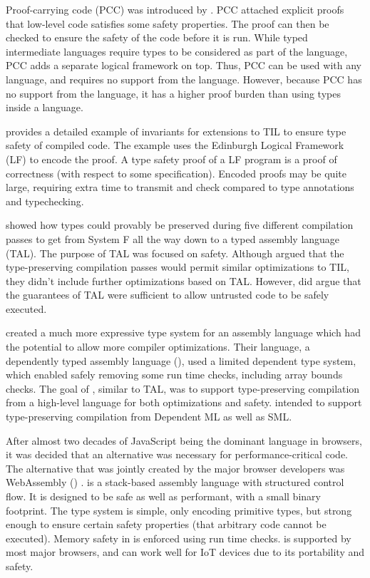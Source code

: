 Proof-carrying code (PCC) was introduced by \citet{PCC}.
PCC attached explicit proofs that low-level code satisfies some safety properties.
The proof can then be checked to ensure the safety of the code before it is run.
While typed intermediate languages require types to be considered as part of the language, PCC adds a separate logical framework on top.
Thus, PCC can be used with any language, and requires no support from the language.
However, because PCC has no support from the language, it has a higher proof burden than using types inside a language.

\citet{PCC} provides a detailed example of invariants for extensions to TIL to ensure type safety of compiled code.
The example uses the Edinburgh Logical Framework (LF) to encode the proof.
A type safety proof of a LF program is a proof of correctness (with respect to some specification).
Encoded proofs may be quite large, requiring extra time to transmit and check compared to type annotations and typechecking.

\citet{FtoTAL} showed how types could provably be preserved during five different compilation passes to get from System F all the way down to a typed assembly language (TAL).
The purpose of TAL was focused on safety.
Although \citet{FtoTAL} argued that the type-preserving compilation passes would permit similar optimizations to TIL, they didn't include further optimizations based on TAL.
However, \citet{FtoTAL} did argue that the guarantees of TAL were sufficient to allow untrusted code to be safely executed.

\citet{DTAL} created a much more expressive type system for an assembly language which had the potential to allow more compiler optimizations.
Their language, a dependently typed assembly language (\dtal), used a limited dependent type system, which enabled safely removing some run time checks, including array bounds checks.
The goal of \dtal, similar to TAL, was to support type-preserving compilation from a high-level language for both optimizations and safety.
\dtal intended to support type-preserving compilation from Dependent ML as well as SML.

After almost two decades of JavaScript being the dominant language in browsers, it was decided that an alternative was necessary for performance-critical code.
The alternative that was jointly created by the major browser developers was WebAssembly (\wasm) \cite{WASM}.
\wasm is a stack-based assembly language with structured control flow.
It is designed to be safe as well as performant, with a small binary footprint.
The \wasm type system is simple, only encoding primitive types, but strong enough to ensure certain safety properties (\ie that arbitrary code cannot be executed).
Memory safety in \wasm is enforced using run time checks.
\wasm is supported by most major browsers, and can work well for IoT devices due to its portability and safety.

